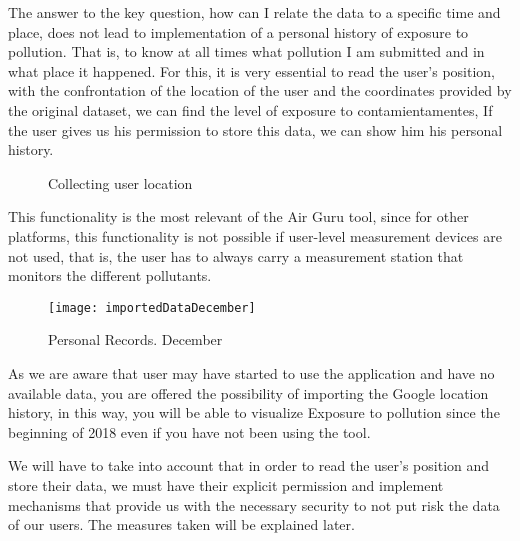     The answer to the key question, how can I relate the data to a specific time and place, does not lead to
    implementation of a personal history of exposure to pollution. That is, to know at all times what pollution
    I am submitted and in what place it happened.
    For this, it is very essential to read the user's position, with the confrontation of the location of the
    user and the coordinates provided by the original dataset, we can find the level of exposure to contamientamentes,
    If the user gives us his permission to store this data, we can show him his personal history.
    \begin{figure}[ht]
      \centering 
        \caption{Collecting user location}
      \end{figure}

      This functionality is the most relevant of the Air Guru tool, since for other platforms, this functionality is not
      possible if user-level measurement devices are not used, that is, the user has to always carry
      a measurement station that monitors the different pollutants. \\
      \begin{figure}[ht]
         \centering
         \texttt{[image: importedDataDecember]}
         \caption{Personal Records. December}
     \end{figure}
     As we are aware that user may have started to use the application and have no available data,
     you are offered the possibility of importing the Google location history, in this way, you will be able to visualize
     Exposure to pollution since the beginning of 2018 even if you have not been using the tool.
     
     We will have to take into account that in order to read the user's position and store their data, we must
     have their explicit permission and implement mechanisms that provide us with the necessary security to not put
     risk the data of our users. The measures taken will be explained later.
     
